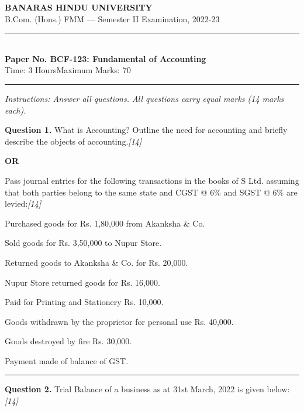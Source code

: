 \documentclass[11pt,a4paper]{article}
\newcommand{\pts}[1]{\hfill   \textit{[#1]}}
\begin{document}
\begin{center}
  {\large\bfseries BANARAS HINDU UNIVERSITY}\\[2pt]
  {\normalsize B.Com. (Hons.) FMM --- Semester II Examination, 2022-23}\\[6pt]
  \rule{0.8\linewidth}{0.5pt}\\[6pt]
  {\large\bfseries Paper No. BCF-123: Fundamental of Accounting}\\[4pt]
  {\normalsize Time: 3 Hours\hfill Maximum Marks: 70}
\end{center}

\rule{\linewidth}{0.4pt}

\smallskip



\noindent   \textit{Instructions: Answer all questions. All questions carry equal marks (14 marks each).}

\bigskip




\noindent   \textbf{Question 1.}
What is Accounting? Outline the need for accounting and briefly describe the objects of accounting.\pts{14}

\centerline{   \textbf{OR}}

Pass journal entries for the following transactions in the books of S Ltd. assuming that both parties belong to the same state and CGST @ 6\% and SGST @ 6\% are levied:\pts{14}

\begin{parts}
  \item Purchased goods for Rs. 1,80,000 from Akanksha \& Co.
  \item Sold goods for Rs. 3,50,000 to Nupur Store.
  \item Returned goods to Akanksha \& Co. for Rs. 20,000.
  \item Nupur Store returned goods for Rs. 16,000.
  \item Paid for Printing and Stationery Rs. 10,000.
  \item Goods withdrawn by the proprietor for personal use Rs. 40,000.
  \item Goods destroyed by fire Rs. 30,000.
  \item Payment made of balance of GST.
\end{parts}

\medskip\rule{\linewidth}{0.2pt}


\newpage




\noindent   \textbf{Question 2.}
Trial Balance of a business as at 31st March, 2022 is given below:\pts{14}
\end{document}
